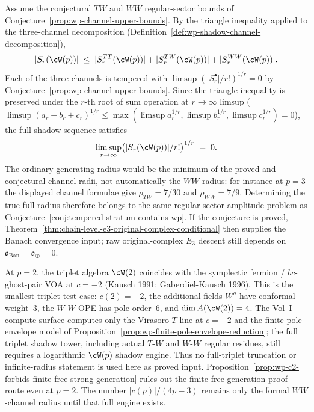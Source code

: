 \begin{remark}
Assume the conjectural $TW$ and $WW$ regular-sector bounds of
Conjecture~\ref{prop:wp-channel-upper-bounds}. By the triangle
inequality applied to the three-channel decomposition
(Definition~\ref{def:wp-shadow-channel-decomposition}),
\[
 \lvert S_r(\cW(p)) \rvert \;\le\;
 \lvert S_r^{TT}(\cW(p)) \rvert +
 \lvert S_r^{TW}(\cW(p)) \rvert +
 \lvert S_r^{WW}(\cW(p)) \rvert.
\]
Each of the three channels is tempered with
$\limsup (\lvert S_r^\bullet \rvert / r!)^{1/r} = 0$ by
Conjecture~\ref{prop:wp-channel-upper-bounds}. Since the triangle
inequality is preserved under the $r$-th root of sum operation at
$r \to \infty$ limsup ($\limsup (a_r + b_r + c_r)^{1/r} \le
\max(\limsup a_r^{1/r}, \limsup b_r^{1/r}, \limsup c_r^{1/r}) = 0$),
the full shadow sequence satisfies
\[
 \limsup_{r \to \infty}
 \bigl( \lvert S_r(\cW(p)) \rvert / r! \bigr)^{1/r} \;=\; 0.
\]
The ordinary-generating radius would be the minimum of the proved
and conjectural channel radii, not automatically the $WW$ radius:
for instance at $p=3$ the displayed channel formulae give
$\rho_{TW}=7/30$ and $\rho_{WW}=7/9$. Determining the true full
radius therefore belongs to the same regular-sector amplitude
problem as Conjecture~\ref{conj:tempered-stratum-contains-wp}.
If the conjecture is proved, Theorem~\ref{thm:chain-level-e3-original-complex-conditional}
then supplies the Banach convergence input; raw original-complex
$E_3$ descent still depends on
$\mathfrak{o}_{\mathrm{Ban}}=\mathfrak{o}_{\oplus}=0$.
\end{remark}

\begin{remark}
\label{rem:p2-symplectic-fermion-truncation}
At $p = 2$, the triplet algebra $\cW(2)$ coincides with the
symplectic fermion / $bc$-ghost-pair VOA at $c = -2$ (Kausch 1991;
Gaberdiel-Kausch 1996). This is the smallest triplet test case:
$c(2)=-2$, the additional fields $W^a$ have conformal weight~$3$,
the $W$-$W$ OPE has pole order~$6$, and
$\dim A(\cW(2))=4$. The Vol~I compute surface computes
only the Virasoro $T$-line at $c=-2$ and the finite pole-envelope model
of Proposition~\ref{prop:wp-finite-pole-envelope-reduction}; the full
triplet shadow tower, including actual $T$-$W$ and $W$-$W$ regular
residues, still requires a logarithmic $\cW(p)$ shadow engine. Thus no
full-triplet truncation or infinite-radius statement is used here as
proved input. Proposition~\ref{prop:wp-c2-forbids-finite-free-strong-generation}
rules out the finite-free-generation proof route even at $p=2$. The
number $\lvert c(p)\rvert/(4p-3)$ remains only the formal $WW$-channel
radius until that full engine exists.
\end{remark}

